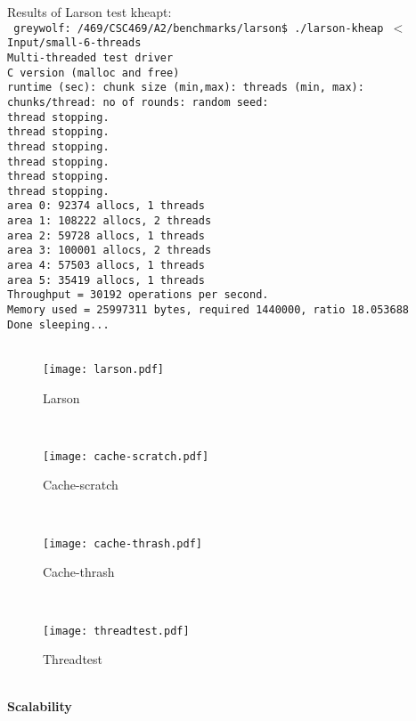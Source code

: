 \documentclass{article}
\begin{document}
Results of Larson test kheapt:
\\
\texttt{
greywolf:~/469/CSC469/A2/benchmarks/larson\$  ./larson-kheap $<$ Input/small-6-threads
\\
Multi-threaded test driver 
\\
C version (malloc and free)
\\
runtime (sec): chunk size (min,max): threads (min, max):   chunks/thread:  no of rounds:   random seed:
\\    
thread stopping.
\\
thread stopping.
\\
thread stopping.
\\
thread stopping.
\\
thread stopping.
\\
thread stopping.
\\
area 0: 92374 allocs, 1 threads
\\
area 1: 108222 allocs, 2 threads
\\
area 2: 59728 allocs, 1 threads
\\
area 3: 100001 allocs, 2 threads
\\
area 4: 57503 allocs, 1 threads
\\
area 5: 35419 allocs, 1 threads
\\
Throughput =    30192 operations per second.
\\
Memory used = 25997311 bytes, required 1440000, ratio 18.053688
\\
Done sleeping...
}
\\
\\
\begin{figure}[!p]
\centering
\texttt{[image: larson.pdf]}
\caption{Larson}
\label{Larson}
\end{figure}
\\
\begin{figure}[!p]
\centering
\texttt{[image: cache-scratch.pdf]}
\caption{Cache-scratch}
\label{Cache-scratch}
\end{figure}
\\
\begin{figure}[!p]
\centering
\texttt{[image: cache-thrash.pdf]}
\caption{Cache-thrash}
\label{cache-thrash}
\end{figure}
\\
\begin{figure}[!p]
\centering
\texttt{[image: threadtest.pdf]}
\caption{Threadtest}
\label{Threadtest}
\end{figure}
\\
\newpage
\noindent
\textbf{Scalability}
\\
\end{document}
